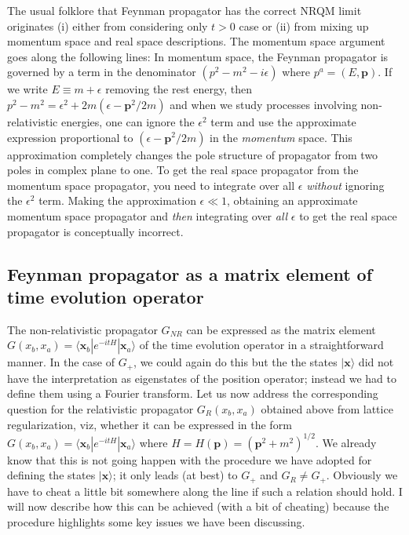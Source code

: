\documentclass[12pt]{article}
\def\ket#1{|#1\rangle}                    %
\def\bk#1#2#3{{\langle #1|#2|#3\rangle}}  %
\begin{document}
 The usual folklore that Feynman propagator has the correct NRQM limit originates (i) either from considering only $t>0$ case or (ii) from mixing up momentum space and real space descriptions. The momentum space argument goes along the following lines: In momentum space, the Feynman propagator is governed by a term in the denominator $(p^2-m^2-i\epsilon)$ where $p^a=(E,\bm p)$. If we write $E\equiv m+\epsilon$ removing the rest energy, then $p^2-m^2=\epsilon^2+2m(\epsilon-\bm{p}^2/2m)$ and when we study processes involving non-relativistic energies, one can ignore the $\epsilon^2$ term and use the approximate  expression proportional to $(\epsilon-\bm{p}^2/2m)$  in the \textit{momentum} space. This approximation completely changes the pole structure of propagator from two poles in complex plane to one. To get the real space propagator from the momentum space propagator, you need to integrate over all $\epsilon$ \textit{without} ignoring the $\epsilon^2$ term. Making the approximation $\epsilon\ll1$, obtaining an approximate momentum space propagator and \textit{then} integrating over \textit{all} $\epsilon$ to get the real space propagator is conceptually incorrect. 
  
  \subsection{Feynman propagator as a matrix element of time evolution operator}\label{sec:fmatrix} 
  
 The non-relativistic propagator $G_{NR}$ can be expressed as the matrix element  $G(x_b , x_a) = \bk{\bm{x}_b}{e^{-itH}}{\bm{x}_a}$ of the 
  time evolution operator in a straightforward manner. In the case of $G_{+}$, we could again do this but the the states $\ket{\bm{x}}$ did not have the interpretation as eigenstates of the position operator; instead we had to define them using a Fourier transform. 
  Let us now address the corresponding question for the relativistic propagator $G_R(x_b,x_a)$ obtained above from lattice regularization, viz, whether it can  be expressed in the form $G(x_b , x_a) = \bk{\bm{x}_b}{e^{-itH}}{\bm{x}_a}$ where $H=H(\bm{p}) =({\bm p}^2+m^2)^{1/2}$.  We already know that this is not going happen  with the  procedure we have adopted for defining the states $\ket{\bm x}$; it only leads (at best) to $G_{+}$ and $G_R\neq G_{+}$. Obviously we have to cheat a little bit 
  somewhere along the line if such a relation should hold. I will now describe how this can be achieved (with a bit of cheating) because the procedure highlights some key issues we have been discussing. 
  
\end{document}
